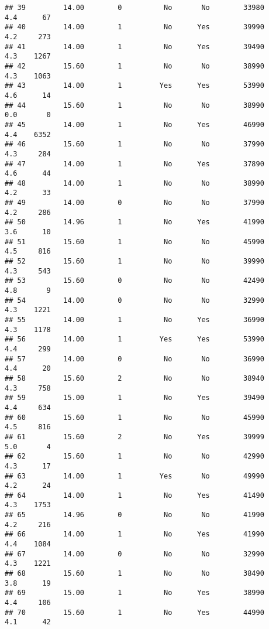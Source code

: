 \documentclass[
]{article}
\begin{document}
\begin{verbatim}
## 39         14.00        0          No       No        33980         4.4      67
## 40         14.00        1          No      Yes        39990         4.2     273
## 41         14.00        1          No      Yes        39490         4.3    1267
## 42         15.60        1          No       No        38990         4.3    1063
## 43         14.00        1         Yes      Yes        53990         4.6      14
## 44         15.60        1          No       No        38990         0.0       0
## 45         14.00        1          No      Yes        46990         4.4    6352
## 46         15.60        1          No       No        37990         4.3     284
## 47         14.00        1          No      Yes        37890         4.6      44
## 48         14.00        1          No       No        38990         4.2      33
## 49         14.00        0          No       No        37990         4.2     286
## 50         14.96        1          No      Yes        41990         3.6      10
## 51         15.60        1          No       No        45990         4.5     816
## 52         15.60        1          No       No        39990         4.3     543
## 53         15.60        0          No       No        42490         4.8       9
## 54         14.00        0          No       No        32990         4.3    1221
## 55         14.00        1          No      Yes        36990         4.3    1178
## 56         14.00        1         Yes      Yes        53990         4.4     299
## 57         14.00        0          No       No        36990         4.4      20
## 58         15.60        2          No       No        38940         4.3     758
## 59         15.00        1          No      Yes        39490         4.4     634
## 60         15.60        1          No       No        45990         4.5     816
## 61         15.60        2          No      Yes        39999         5.0       4
## 62         15.60        1          No       No        42990         4.3      17
## 63         14.00        1         Yes       No        49990         4.2      24
## 64         14.00        1          No      Yes        41490         4.3    1753
## 65         14.96        0          No       No        41990         4.2     216
## 66         14.00        1          No      Yes        41990         4.4    1084
## 67         14.00        0          No       No        32990         4.3    1221
## 68         15.60        1          No       No        38490         3.8      19
## 69         15.00        1          No      Yes        38990         4.4     106
## 70         15.60        1          No      Yes        44990         4.1      42

\end{verbatim}
\end{document}
